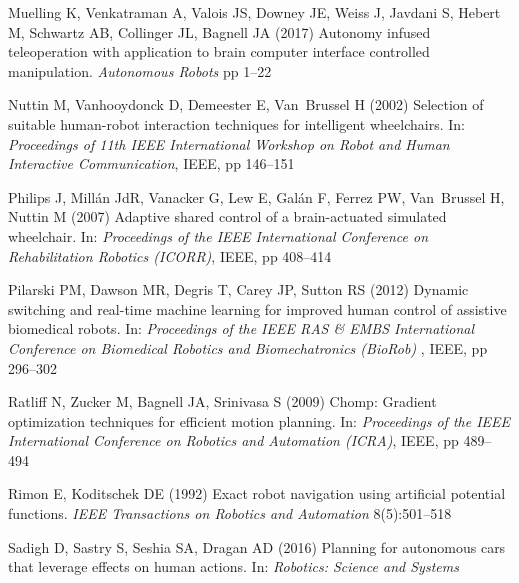 \documentclass[natbib, twocolumn]{svjour3}          %
\begin{document}
\begin{thebibliography}{54}
	Muelling K, Venkatraman A, Valois JS, Downey JE, Weiss J, Javdani S, Hebert M,
	Schwartz AB, Collinger JL, Bagnell JA (2017) Autonomy infused teleoperation
	with application to brain computer interface controlled manipulation.
	\textit{Autonomous Robots} pp 1--22
	
	Nuttin M, Vanhooydonck D, Demeester E, Van~Brussel H (2002) Selection of
	suitable human-robot interaction techniques for intelligent wheelchairs. In:
	\textit{Proceedings of 11th IEEE International Workshop on Robot and Human
		Interactive Communication}, IEEE, pp 146--151
	
	Philips J, Mill{\'a}n JdR, Vanacker G, Lew E, Gal{\'a}n F, Ferrez PW,
	Van~Brussel H, Nuttin M (2007) Adaptive shared control of a brain-actuated
	simulated wheelchair. In: \textit{Proceedings of the IEEE International
		Conference on Rehabilitation Robotics (ICORR)}, IEEE, pp 408--414
	
	Pilarski PM, Dawson MR, Degris T, Carey JP, Sutton RS (2012) Dynamic switching
	and real-time machine learning for improved human control of assistive
	biomedical robots. In: \textit{Proceedings of the IEEE RAS \& EMBS
		International Conference on Biomedical Robotics and Biomechatronics (BioRob)
	}, IEEE, pp 296--302
	
	Ratliff N, Zucker M, Bagnell JA, Srinivasa S (2009) Chomp: Gradient
	optimization techniques for efficient motion planning. In:
	\textit{Proceedings of the IEEE International Conference on Robotics and
		Automation (ICRA)}, IEEE, pp 489--494
	
	Rimon E, Koditschek DE (1992) Exact robot navigation using artificial potential
	functions. \textit{IEEE Transactions on Robotics and Automation}
	8(5):501--518
	
	Sadigh D, Sastry S, Seshia SA, Dragan AD (2016{}) Planning for
	autonomous cars that leverage effects on human actions. In: \textit{Robotics:
		Science and Systems}
	

\end{thebibliography}
\end{document}
